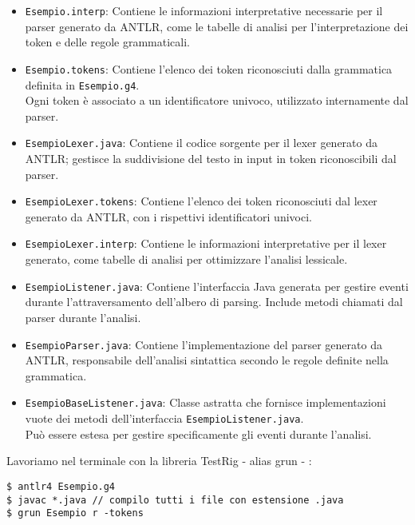 \documentclass{article}
\begin{document}
\begin{itemize}
    \item \texttt{Esempio.interp}: Contiene le informazioni interpretative necessarie per il parser generato da ANTLR, come le tabelle di analisi per l'interpretazione dei token e delle regole grammaticali.
    
    \item \texttt{Esempio.tokens}: Contiene l'elenco dei token riconosciuti dalla grammatica definita in \texttt{Esempio.g4}.\\\noindent Ogni token è associato a un identificatore univoco, utilizzato internamente dal parser.
    
    \item \texttt{EsempioLexer.java}:  Contiene il codice sorgente per il lexer generato da ANTLR; gestisce la suddivisione del testo in input in token riconoscibili dal parser.
    
    \item \texttt{EsempioLexer.tokens}: Contiene l'elenco dei token riconosciuti dal lexer generato da ANTLR, con i rispettivi identificatori univoci.
    
    \item \texttt{EsempioLexer.interp}: Contiene le informazioni interpretative per il lexer generato, come tabelle di analisi per ottimizzare l'analisi lessicale.
    \item \texttt{EsempioListener.java}: Contiene l'interfaccia Java generata per gestire eventi durante l'attraversamento dell'albero di parsing. Include metodi chiamati dal parser durante l'analisi.
    
    \item \texttt{EsempioParser.java}: Contiene l'implementazione del parser generato da ANTLR, responsabile dell'analisi sintattica secondo le regole definite nella grammatica.
    
    \item \texttt{EsempioBaseListener.java}: Classe astratta che fornisce implementazioni vuote dei metodi dell'interfaccia \texttt{EsempioListener.java}.\\\noindent Può essere estesa per gestire specificamente gli eventi durante l'analisi.
\end{itemize}
\noindent
Lavoriamo nel terminale con la libreria TestRig - alias grun - :
\begin{verbatim}
$ antlr4 Esempio.g4
$ javac *.java // compilo tutti i file con estensione .java
$ grun Esempio r -tokens
\end{verbatim}
\end{document}
